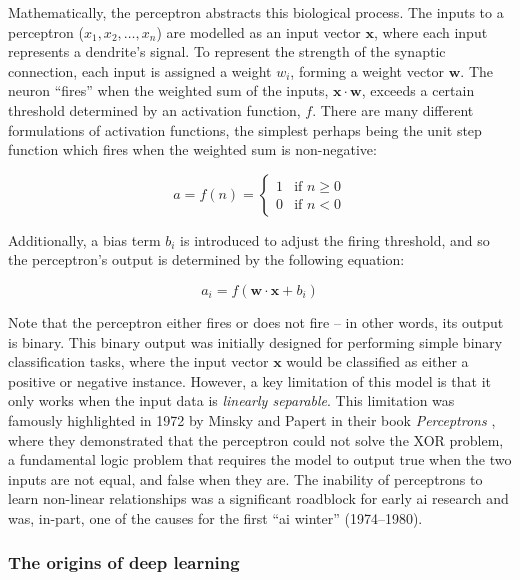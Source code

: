 Mathematically, the perceptron abstracts this biological process. The inputs to a perceptron ($x_1, x_2, \ldots, x_n$) are modelled as an input vector $\bm{x}$, where each input represents a dendrite's signal. To represent the strength of the synaptic connection, each input is assigned a weight $w_i$, forming a weight vector $\bm{w}$. The neuron ``fires'' when the weighted sum of the inputs, $\bm{x} \cdot \bm{w}$, exceeds a certain threshold determined by an activation function, $f$. There are many different formulations of activation functions, the simplest perhaps being the unit step function which fires when the weighted sum is non-negative:

\begin{equation}
    a = f(n) = 
    \begin{cases}
        1 & \text{if } n \geq 0 \\
        0 & \text{if } n < 0
    \end{cases}
\end{equation}

Additionally, a bias term $b_i$ is introduced to adjust the firing threshold, and so the perceptron's output is determined by the following equation:

\begin{equation}
a_i = f(\bm{w} \cdot \bm{x} + b_i)
\end{equation}

Note that the perceptron either fires or does not fire -- in other words, its output is binary. This binary output was initially designed for performing simple binary classification tasks, where the input vector $\bm{x}$ would be classified as either a positive or negative instance. However, a key limitation of this model is that it only works when the input data is \textit{linearly separable}. This limitation was famously highlighted in 1972 by Minsky and Papert in their book \textit{Perceptrons} \cite{minsky_perceptrons_1972}, where they demonstrated that the perceptron could not solve the XOR problem, a fundamental logic problem that requires the model to output true when the two inputs are not equal, and false when they are. The inability of perceptrons to learn non-linear relationships was a significant roadblock for early \acrshort{ai} research and was, in-part, one of the causes for the first ``\acrshort{ai} winter'' (1974–1980).

\subsubsection{The origins of deep learning}

